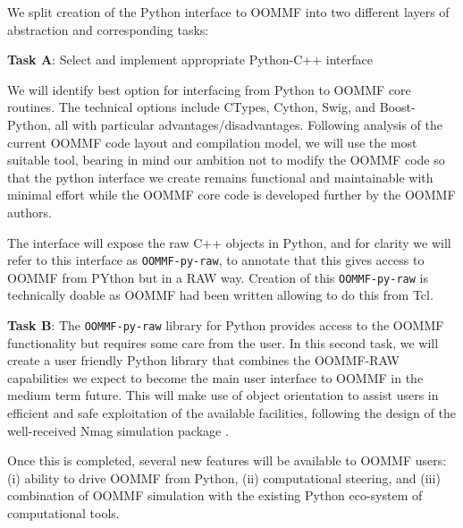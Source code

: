 \begin{workpackage}
\begin{tasklist}


\begin{task}[id=oommf-python-interface,title=OOMMF case study: Create Python interface to OOMMF code]

  We split creation of the Python interface to OOMMF into two
  different layers of abstraction and corresponding tasks:

  \textbf{Task A}: Select and implement appropriate Python-C++ interface

  We will identify best option for interfacing from Python to OOMMF
  core routines. The technical options include CTypes, Cython, Swig,
  and Boost-Python, all with particular
  advantages/disadvantages. Following analysis of the current OOMMF
  code layout and compilation model, we will use the most suitable
  tool, bearing in mind our ambition not to modify the OOMMF code so
  that the python interface we create remains functional and
  maintainable with minimal effort while the OOMMF core code is
  developed further by the OOMMF authors.

  The interface will expose the raw C++ objects in Python, and for
  clarity we will refer to this interface as \texttt{OOMMF-py-raw}, to
  annotate that this gives access to OOMMF from PYthon but in a RAW
  way. Creation of this \texttt{OOMMF-py-raw} is technically doable as
  OOMMF had been written allowing to do this from Tcl.

  \textbf{Task B}: The \texttt{OOMMF-py-raw} library for Python
  provides access to the OOMMF functionality but requires some care
  from the user. In this second task, we will create a user friendly
  Python library that combines the OOMMF-RAW capabilities we expect to
  become the main user interface to OOMMF in the medium term
  future. This will make use of object orientation to assist users in
  efficient and safe exploitation of the available facilities,
  following the design of the well-received Nmag simulation package
  \cite{Nmag-url}.

  Once this is completed, several new features will be available to
  OOMMF users: (i) ability to drive OOMMF from Python, (ii)
  computational steering, and (iii) combination of OOMMF simulation
  with the existing Python eco-system of computational tools.



\end{task}
\end{tasklist}
\end{workpackage}
